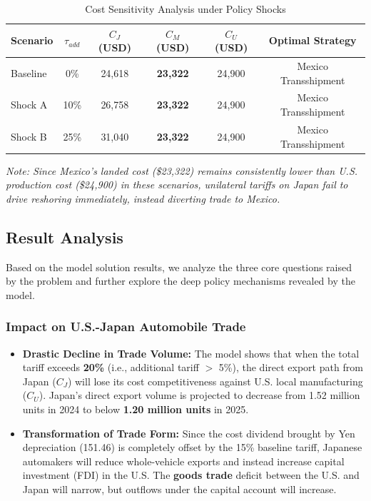 \documentclass{apmcmthesis}
\begin{document}
\begin{table}[H]
\centering
\caption{Cost Sensitivity Analysis under Policy Shocks}
\begin{tabular}{lccccc}
\toprule
\textbf{Scenario} & \textbf{$\tau_{add}$} & \textbf{$C_J$ (USD)} & \textbf{$C_M$ (USD)} & \textbf{$C_U$ (USD)} & \textbf{Optimal Strategy} \\
\midrule
Baseline & 0\% & 24,618 & \textbf{23,322} & 24,900 & Mexico Transshipment \\
Shock A & 10\% & 26,758 & \textbf{23,322} & 24,900 & Mexico Transshipment \\
Shock B & 25\% & 31,040 & \textbf{23,322} & 24,900 & Mexico Transshipment \\
\bottomrule
\end{tabular}
\label{tab:scenarios}
\vspace{0.5em}
\parbox{0.9\textwidth}{\footnotesize \textit{Note: Since Mexico's landed cost (\$23,322) remains consistently lower than U.S. production cost (\$24,900) in these scenarios, unilateral tariffs on Japan fail to drive reshoring immediately, instead diverting trade to Mexico.}}
\end{table}

\subsection{Result Analysis}

Based on the model solution results, we analyze the three core questions raised by the problem and further explore the deep policy mechanisms revealed by the model.

\subsubsection{Impact on U.S.-Japan Automobile Trade}
\begin{itemize}
    \item \textbf{Drastic Decline in Trade Volume:} The model shows that when the total tariff exceeds \textbf{20\%} (i.e., additional tariff $>$ 5\%), the direct export path from Japan ($C_J$) will lose its cost competitiveness against U.S. local manufacturing ($C_U$). Japan's direct export volume is projected to decrease from 1.52 million units in 2024 to below \textbf{1.20 million units} in 2025.
    \item \textbf{Transformation of Trade Form:} Since the cost dividend brought by Yen depreciation (151.46) is completely offset by the 15\% baseline tariff, Japanese automakers will reduce whole-vehicle exports and instead increase capital investment (FDI) in the U.S. The \textbf{goods trade} deficit between the U.S. and Japan will narrow, but outflows under the capital account will increase.
\end{itemize}
\end{document}
